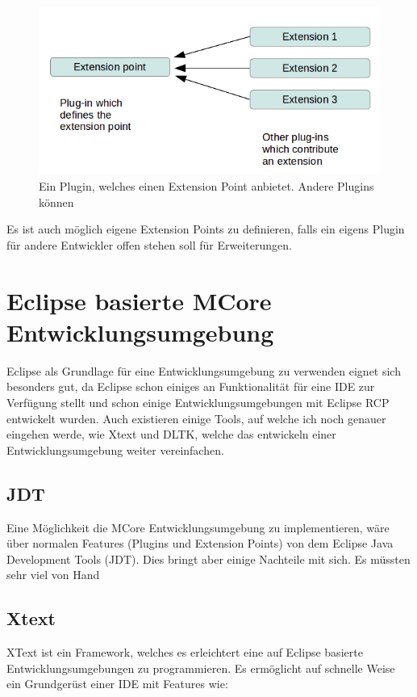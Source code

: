 \begin{figure}[H]
	\centering
		\includegraphics[scale=0.5]{platform/extensionpoint.png}
		\caption{Ein Plugin, welches einen Extension Point anbietet. Andere Plugins können}
		\label{fig:extensionpoint}
\end{figure}

Es ist auch möglich eigene Extension Points zu definieren, falls ein eigens Plugin für andere Entwickler offen stehen soll für Erweiterungen.

\section{Eclipse basierte MCore Entwicklungsumgebung}

Eclipse als Grundlage für eine Entwicklungsumgebung zu verwenden eignet sich besonders gut, da Eclipse schon einiges an Funktionalität für eine IDE zur Verfügung stellt und schon einige Entwicklungsumgebungen mit Eclipse RCP entwickelt wurden. Auch existieren einige Tools, auf welche ich noch genauer eingehen werde, wie Xtext und DLTK, welche das entwickeln einer Entwicklungsumgebung weiter vereinfachen.

\subsection{JDT}
Eine Möglichkeit die MCore Entwicklungsumgebung zu implementieren, wäre über normalen Features (Plugins und Extension Points) von dem Eclipse Java Development Tools (JDT). Dies bringt aber einige Nachteile mit sich. Es müssten sehr viel von Hand 

\subsection{Xtext}
XText ist ein Framework, welches es erleichtert eine auf Eclipse basierte Entwicklungsumgebungen zu programmieren. Es ermöglicht auf schnelle Weise ein Grundgerüst einer IDE mit Features wie:

